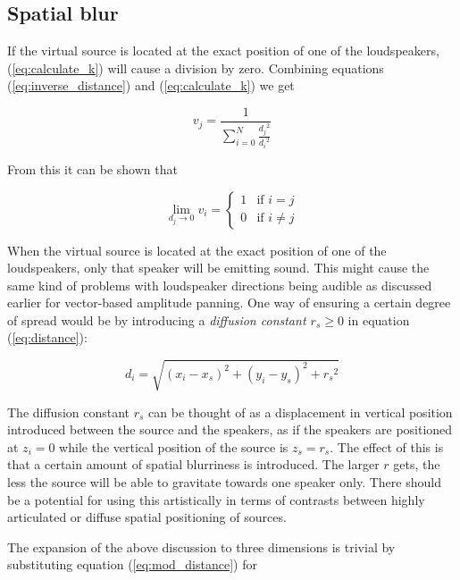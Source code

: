 \documentclass[twoside,10pt]{article}
\begin{document}
\subsection{Spatial blur}

If the virtual source is located at the exact position of one of the loudspeakers, (\ref{eq:calculate_k}) will cause a division by zero. Combining equations (\ref{eq:inverse_distance}) and (\ref{eq:calculate_k}) we get

\begin{equation}
v_{j} = \frac{1}{\sum_{i=0}^{N} \frac{{d_{j}}^2}{{d_{i}}^2}}
\end{equation}

From this it can be shown that

\begin{equation} \label{eq:distance_zero}
\lim_{d_{j} \rightarrow 0} v_{i} = 
\left\{ \begin{array}{ll} 
1 & \textrm{if $i=j$}\\ 
0 & \textrm{if $i \ne j$}
\end{array} \right.
\end{equation}

When the virtual source is located at the exact position of one of the loudspeakers, only that speaker will be emitting sound. This might cause the same kind of problems with loudspeaker directions being audible as discussed earlier for vector-based amplitude panning. One way of ensuring a certain degree of spread would be by introducing a \textit{diffusion constant $r_{s} \ge 0$} in equation (\ref{eq:distance}):

\begin{equation} \label{eq:mod_distance}
d_{i} = \sqrt{ {(x_{i} - x_{s})}^2 + {(y_{i} - y_{s})}^2 + {r_{s}}^2}
\end{equation}

The diffusion constant $r_{s}$ can be thought of as a displacement in vertical position introduced between the source and the speakers, as if the speakers are positioned at $z_{i}=0$ while the vertical position of the source is $z_{s}=r_{s}$. The effect of this is that a certain amount of spatial blurriness is introduced. The larger $r$ gets, the less the source will be able to gravitate towards one speaker only. There should be a potential for using this artistically in terms of contrasts between highly articulated or diffuse spatial positioning of sources.

The expansion of the above discussion to three dimensions is trivial by substituting equation (\ref{eq:mod_distance}) for
\end{document}
